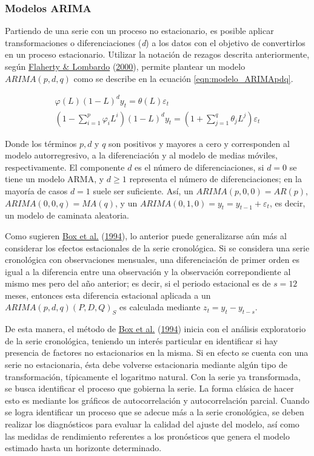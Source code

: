 \documentclass[
]{article}
\begin{document}
\subsubsection{Modelos ARIMA}

Partiendo de una serie con un proceso no estacionario, es posible
aplicar transformaciones o diferenciaciones (\emph{d}) a los datos con
el objetivo de convertirlos en un proceso estacionario. Utilizar la
notación de rezagos descrita anteriormente, según
\protect\hyperlink{ref-Lombardo}{Flaherty \& Lombardo}
(\protect\hyperlink{ref-Lombardo}{2000}), permite plantear un modelo
\(ARIMA(p,d,q)\) como se describe en la ecuación
\ref{eqn:modelo_ARIMApdq}.

\begin{equation}
\label{eqn:modelo_ARIMApdq}
\begin{array}{lll}
\varphi(L)(1-L)^dy_t=\theta(L)\varepsilon_t \\
\left(1-\sum_{i=1}^p \varphi_iL^i \right)(1-L)^d y_t=\left(1+\sum_{j=1}^q \theta_jL^j \right) \varepsilon_t
\end{array}
\end{equation}

Donde los términos \(p, d\) y \(q\) son positivos y mayores a cero y
corresponden al modelo autorregresivo, a la diferenciación y al modelo
de medias móviles, respectivamente. El componente \(d\) es el número de
diferenciaciones, si \(d=0\) se tiene un modelo ARMA, y \(d\geq1\)
representa el número de diferenciaciones; en la mayoría de casos \(d=1\)
suele ser suficiente. Así, un \(ARIMA(p,0,0)=AR(p)\),
\(ARIMA(0,0,q)=MA(q)\), y un \(ARIMA(0,1,0)=y_t=y_{t-1}+\varepsilon_t\),
es decir, un modelo de caminata aleatoria.

Como sugieren \protect\hyperlink{ref-box-jenkins}{Box et al.}
(\protect\hyperlink{ref-box-jenkins}{1994}), lo anterior puede
generalizarse aún más al considerar los efectos estacionales de la serie
cronológica. Si se considera una serie cronológica con observaciones
mensuales, una diferenciación de primer orden es igual a la diferencia
entre una observación y la observación correpondiente al mismo mes pero
del año anterior; es decir, si el periodo estacional es de \(s=12\)
meses, entonces esta diferencia estacional aplicada a un
\(ARIMA(p,d,q)(P,D,Q)_S\) es calculada mediante \(z_t=y_t-y_{t-s}\).

De esta manera, el método de \protect\hyperlink{ref-box-jenkins}{Box et
al.} (\protect\hyperlink{ref-box-jenkins}{1994}) inicia con el análisis
exploratorio de la serie cronológica, teniendo un interés particular en
identificar si hay presencia de factores no estacionarios en la misma.
Si en efecto se cuenta con una serie no estacionaria, ésta debe volverse
estacionaria mediante algún tipo de transformación, típicamente el
logaritmo natural. Con la serie ya transformada, se busca identificar el
proceso que gobierna la serie. La forma clásica de hacer esto es
mediante los gráficos de autocorrelación y autocorrelación parcial.
Cuando se logra identificar un proceso que se adecue más a la serie
cronológica, se deben realizar los diagnósticos para evaluar la calidad
del ajuste del modelo, así como las medidas de rendimiento referentes a
los pronósticos que genera el modelo estimado hasta un horizonte
determinado.
\end{document}
